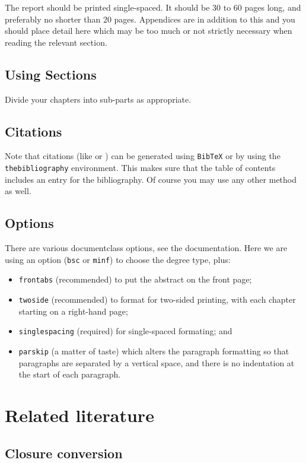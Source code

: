 \documentclass[bsc,frontabs,oneside,singlespacing,parskip,deptreport]{infthesis}
\theoremstyle{definition}
\begin{document}
The report should be printed single-spaced.
It should be 30 to 60 pages long, and preferably no shorter than 20 pages.
Appendices are in addition to this and you should place detail
here which may be too much or not strictly necessary when reading the relevant section.

\section{Using Sections}

Divide your chapters into sub-parts as appropriate.

\section{Citations}

Note that citations
(like \cite{P1} or \cite{P2})
can be generated using {\tt BibTeX} or by using the
{\tt thebibliography} environment. This makes sure that the
table of contents includes an entry for the bibliography.
Of course you may use any other method as well.

\section{Options}

There are various documentclass options, see the documentation.  Here we are
using an option ({\tt bsc} or {\tt minf}) to choose the degree type, plus:
\begin{itemize}
\item {\tt frontabs} (recommended) to put the abstract on the front page;
\item {\tt twoside} (recommended) to format for two-sided printing, with
  each chapter starting on a right-hand page;
\item {\tt singlespacing} (required) for single-spaced formating; and
\item {\tt parskip} (a matter of taste) which alters the paragraph formatting so that
paragraphs are separated by a vertical space, and there is no
indentation at the start of each paragraph.
\end{itemize}






\chapter{Related literature}
\section{Closure conversion}
\end{document}
